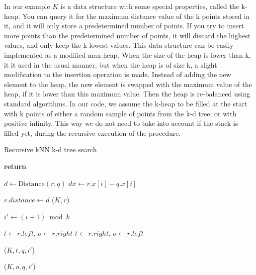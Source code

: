 In our example $K$ is a data structure with some special properties, called the k-heap. You can query it for the maximum distance value of the k points stored in it, and it will only store a predetermined number of points. If you try to insert more points than the predetermined number of points, it will discard the highest values, and only keep the k lowest values. This data structure can be easily implemented as a modified max-heap. When the size of the heap is lower than k, it it used in the usual manner, but when the heap is of size k, a slight modification to the insertion operation is made. Instead of adding the new element to the heap, the new element is swapped with the maximum value of the heap, if it is lower than this maximum value. Then the heap is re-balanced using standard algorithms. In our code, we assume the k-heap to be filled at the start with k points of either a random sample of points from the k-d tree, or with positive infinity. This way we do not need to take into account if the stack is filled yet, during the recursive execution of the procedure.

\begin{algorithm}
\caption{Recursive kNN k-d tree search}
\label{alg:recursive_knn_kd_tree_search}
\begin{algorithmic}
         
            \State \textbf{return}
        \EndIf

        \State $d \gets \text{Distance}(r, q)$
        \State $dx \gets r.x[i] - q.x[i]$

         
            \State $r.distance \gets d$
            \State {}($K, r$)
        \EndIf

        \State $i' \gets (i + 1) \bmod k$ 

          
            \State $t \gets r.left$, $o \gets r.right$
        \Else
            \State $t \gets r.right$, $o \gets r.left$
        \EndIf

        \State {}($K, t, q, i'$)

         
            \State {}($K, o, q, i'$)
        \EndIf
    \EndProcedure
\end{algorithmic}
\end{algorithm}

